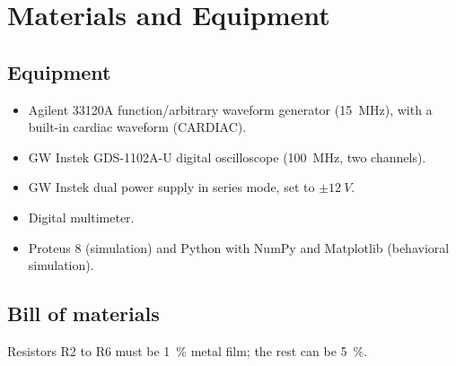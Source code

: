 \documentclass[11pt,letterpaper]{article}
\begin{document}
\section{Materials and Equipment}

\subsection{Equipment}
\begin{itemize}
  \item Agilent 33120A function/arbitrary waveform generator (\SI{15}{MHz}), with a built-in cardiac waveform (CARDIAC).
  \item GW Instek GDS-1102A-U digital oscilloscope (\SI{100}{MHz}, two channels).
  \item GW Instek dual power supply in series mode, set to $\pm\SI{12}{V}$.
  \item Digital multimeter.
  \item Proteus 8 (simulation) and Python with NumPy and Matplotlib (behavioral simulation).
\end{itemize}

\subsection{Bill of materials}
Resistors R2 to R6 must be \SI{1}{\percent} metal film; the rest can be \SI{5}{\percent}.
\end{document}
